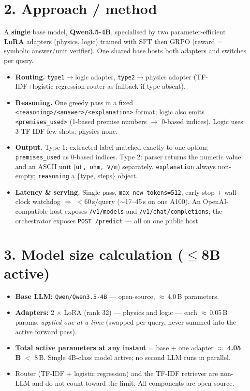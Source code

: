 \documentclass[8pt]{extarticle}
\begin{document}
\section*{2. Approach / method}
A \textbf{single} base model, \textbf{Qwen3.5-4B}, specialised by two
parameter-efficient \textbf{LoRA} adapters (physics, logic) trained with SFT then
GRPO (reward = symbolic answer/unit verifier). One shared base hosts both
adapters and switches per query.
\begin{itemize}
\item \textbf{Routing.} \texttt{type1}$\rightarrow$logic adapter,
\texttt{type2}$\rightarrow$physics adapter (TF-IDF+logistic-regression router as
fallback if type absent).
\item \textbf{Reasoning.} One greedy pass in a fixed
\texttt{<reasoning>/<answer>/<explanation>} format; logic also emits
\texttt{<premises\_used>} (1-based premise numbers $\rightarrow$ 0-based indices).
Logic uses 3 TF-IDF few-shots; physics none.
\item \textbf{Output.} Type 1: extracted label matched exactly to one option;
\texttt{premises\_used} as 0-based indices. Type 2: parser returns the numeric
value and an ASCII unit (\texttt{uF, ohm, V/m}) separately.
\texttt{explanation} always non-empty; \texttt{reasoning} a \{type, steps\}
object.
\item \textbf{Latency \& serving.} Single pass, \texttt{max\_new\_tokens=512},
early-stop + wall-clock watchdog $\Rightarrow$ $<$60\,s/query
($\sim$17--45\,s on one A100). An OpenAI-compatible host exposes
\texttt{/v1/models} and \texttt{/v1/chat/completions}; the orchestrator exposes
\texttt{POST /predict} — all on one public host.
\end{itemize}

\section*{3. Model size calculation ($\le$8B active)}
\begin{itemize}
\item \textbf{Base LLM:} \texttt{Qwen/Qwen3.5-4B} — open-source,
$\approx$\,4.0\,B parameters.
\item \textbf{Adapters:} 2 $\times$ LoRA (rank 32) — physics and logic — each
$\approx$\,0.05\,B params, \emph{applied one at a time} (swapped per query, never
summed into the active forward pass).
\item \textbf{Total active parameters at any instant} = base + one adapter
$\approx$ \textbf{4.05\,B} $<$ 8\,B.  Single 4B-class model active;
no second LLM runs in parallel.
\item Router (TF-IDF + logistic regression) and the TF-IDF retriever are
non-LLM and do not count toward the limit. All components are open-source.
\end{itemize}
\end{document}
